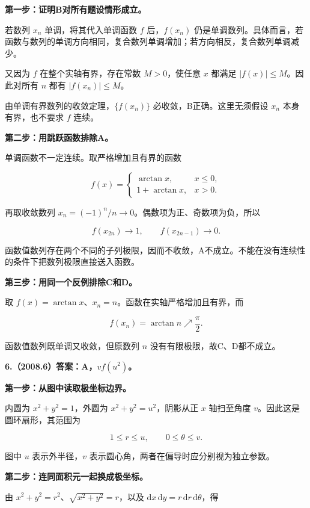 \documentclass[UTF8,11pt,fontset=windows]{ctexart}
\begin{document}
\textbf{第一步：证明B对所有题设情形成立。}

若数列 $x_n$ 单调，将其代入单调函数 $f$ 后，$f(x_n)$ 仍是单调数列。具体而言，若函数与数列的单调方向相同，复合数列单调增加；若方向相反，复合数列单调减少。

又因为 $f$ 在整个实轴有界，存在常数 $M>0$，使任意 $x$ 都满足 $|f(x)|\le M$。因此对所有 $n$ 都有 $|f(x_n)|\le M$。

由单调有界数列的收敛定理，$\{f(x_n)\}$ 必收敛，B正确。这里无须假设 $x_n$ 本身有界，也不要求 $f$ 连续。

\textbf{第二步：用跳跃函数排除A。}

单调函数不一定连续。取严格增加且有界的函数

$$
f(x)=\begin{cases}
\arctan x,&x\le0,\\
1+\arctan x,&x>0.
\end{cases}
$$

再取收敛数列 $x_n=(-1)^n/n\to0$。偶数项为正、奇数项为负，所以

$$
f(x_{2n})\longrightarrow1,
\qquad f(x_{2n-1})\longrightarrow0.
$$

函数值数列存在两个不同的子列极限，因而不收敛，A不成立。不能在没有连续性的条件下把数列极限直接送入函数。

\textbf{第三步：用同一个反例排除C和D。}

取 $f(x)=\arctan x$、$x_n=n$。函数在实轴严格增加且有界，而

$$
f(x_n)=\arctan n\nearrow\frac\pi2.
$$

函数值数列既单调又收敛，但原数列 $n$ 没有有限极限，故C、D都不成立。

\clearpage

\textbf{6.（2008.6）答案：A，$vf(u^2)$。}

\textbf{第一步：从图中读取极坐标边界。}

内圆为 $x^2+y^2=1$，外圆为 $x^2+y^2=u^2$，阴影从正 $x$ 轴扫至角度 $v$。因此这是圆环扇形，其范围为

$$
1\le r\le u,\qquad0\le\theta\le v.
$$

图中 $u$ 表示外半径，$v$ 表示圆心角，两者在偏导时应分别视为独立参数。

\textbf{第二步：连同面积元一起换成极坐标。}

由 $x^2+y^2=r^2$、$\sqrt{x^2+y^2}=r$，以及 $\mathrm dx\,\mathrm dy=r\,\mathrm dr\,\mathrm d\theta$，得
\end{document}
